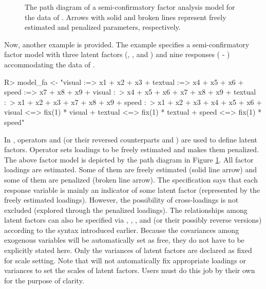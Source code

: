 \documentclass[nojss]{jss}
\begin{document}
\begin{figure}[t!]
\caption{\label{fig:scfa}The path diagram of a semi-confirmatory factor analysis model for the data of \cite{Holzinger1939}. Arrows with solid and broken lines represent freely estimated and penalized parameters, respectively.}
\end{figure}

Now, another example is provided. The example specifies a semi-confirmatory factor model with three latent factors (, , and ) and nine responses ( - ) accommodating the data of \cite{Holzinger1939}.
\begin{Schunk}
\begin{Sinput}
R> model_fa <- "visual  :=> x1 + x2 + x3
+               textual :=> x4 + x5 + x6
+               speed   :=> x7 + x8 + x9
+               visual  :~> x4 + x5 + x6 + x7 + x8 + x9
+               textual :~> x1 + x2 + x3 + x7 + x8 + x9
+               speed   :~> x1 + x2 + x3 + x4 + x5 + x6
+               visual  <=> fix(1) * visual
+               textual <=> fix(1) * textual
+               speed   <=> fix(1) * speed"
\end{Sinput}
\end{Schunk}
In , operators \code{:=>} and \code{:~>} (or their reversed counterparts \code{<=:} and \code{<~:}) are used to define latent factors. Operator \code{:=>} sets loadings to be freely estimated and \code{:~>} makes them penalized. The above factor model is depicted by the path diagram in Figure \ref{fig:scfa}. All factor loadings are estimated. Some of them are freely estimated (solid line arrow) and some of them are penalized (broken line arrow). The specification says that each response variable is mainly an indicator of some latent factor (represented by the freely estimated loadings). However, the possibility of cross-loadings is not excluded (explored through the penalized loadings). The relationships among latent factors can also be specified via \code{=>}, \code{~>}, \code{<=>}, and \code{<~>} (or their possibly reverse versions) according to the syntax introduced earlier. Because the covariances among exogenous variables will be automatically set as free, they do not have to be explicitly stated here. Only the variances of latent factors are declared as fixed for scale setting. Note that  will not automatically fix appropriate loadings or variances to set the scales of latent factors. Users must do this job by their own for the purpose of clarity.
\end{document}
